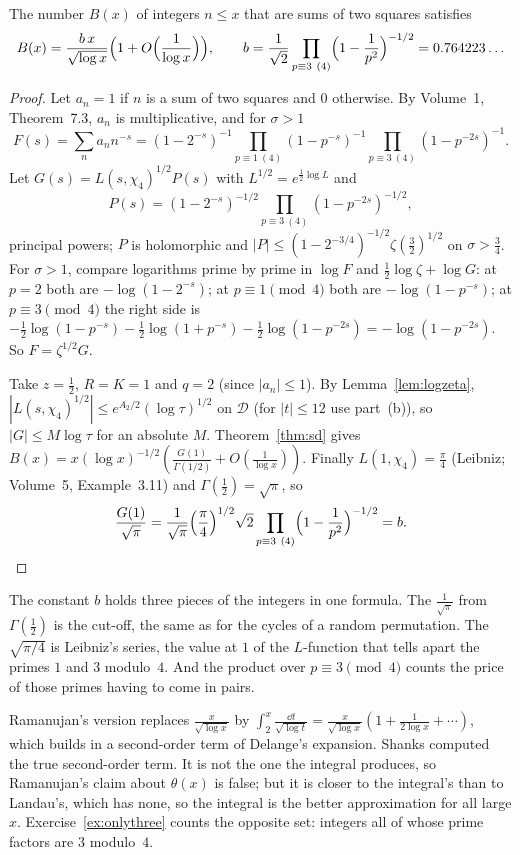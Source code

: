 \begin{corollary}[Landau, 1908]\label{cor:landau}
The number $B(x)$ of integers $n\le x$ that are sums of two squares satisfies
\[
B(x)=\frac{b\,x}{\sqrt{\log x}}\Bigl(1+O\Bigl(\frac1{\log x}\Bigr)\Bigr),\qquad b=\frac1{\sqrt2}\prod_{p\equiv3\ (4)}\Bigl(1-\frac1{p^2}\Bigr)^{-1/2}=0.764223\ldots
\]
\end{corollary}
\begin{proof}
Let $a_n=1$ if $n$ is a sum of two squares and $0$ otherwise. By Volume~1, Theorem~7.3, $a_n$ is multiplicative, and for $\sigma>1$
\[
F(s)=\sum_na_nn^{-s}=(1-2^{-s})^{-1}\prod_{p\equiv1\ (4)}(1-p^{-s})^{-1}\prod_{p\equiv3\ (4)}(1-p^{-2s})^{-1}.
\]
Let $G(s)=L(s,\chi_4)^{1/2}P(s)$ with $L^{1/2}=e^{\frac12\log L}$ and
\[
P(s)=(1-2^{-s})^{-1/2}\prod_{p\equiv3\ (4)}(1-p^{-2s})^{-1/2},
\]
principal powers; $P$ is holomorphic and $|P|\le(1-2^{-3/4})^{-1/2}\zeta(\frac32)^{1/2}$ on $\sigma>\frac34$. For $\sigma>1$, compare logarithms prime by prime in $\log F$ and $\frac12\log\zeta+\log G$: at $p=2$ both are $-\log(1-2^{-s})$; at $p\equiv1\pmod4$ both are $-\log(1-p^{-s})$; at $p\equiv3\pmod4$ the right side is $-\frac12\log(1-p^{-s})-\frac12\log(1+p^{-s})-\frac12\log(1-p^{-2s})=-\log(1-p^{-2s})$. So $F=\zeta^{1/2}G$.

Take $z=\frac12$, $R=K=1$ and $q=2$ (since $|a_n|\le1$). By Lemma~\ref{lem:logzeta}, $|L(s,\chi_4)^{1/2}|\le e^{A_2/2}(\log\tau)^{1/2}$ on $\mathcal D$ (for $|t|\le12$ use part~(b)), so $|G|\le M\log\tau$ for an absolute $M$. Theorem~\ref{thm:sd} gives $B(x)=x(\log x)^{-1/2}(\frac{G(1)}{\Gamma(1/2)}+O(\frac1{\log x}))$. Finally $L(1,\chi_4)=\frac\pi4$ (Leibniz; Volume~5, Example~3.11) and $\Gamma(\frac12)=\sqrt\pi$, so
\[
\frac{G(1)}{\sqrt\pi}=\frac1{\sqrt\pi}\Bigl(\frac\pi4\Bigr)^{1/2}\sqrt2\prod_{p\equiv3\ (4)}\Bigl(1-\frac1{p^2}\Bigr)^{-1/2}=b.\qedhere
\]
\end{proof}

\begin{beauty}
The constant $b$ holds three pieces of the integers in one formula. The $\frac1{\sqrt\pi}$ from $\Gamma(\frac12)$ is the cut-off, the same as for the cycles of a random permutation. The $\sqrt{\pi/4}$ is Leibniz's series, the value at $1$ of the $L$-function that tells apart the primes $1$ and $3$ modulo~$4$. And the product over $p\equiv3\pmod4$ counts the price of those primes having to come in pairs.
\end{beauty}

Ramanujan's version replaces $\frac x{\sqrt{\log x}}$ by $\int_2^x\frac{\dd t}{\sqrt{\log t}}=\frac x{\sqrt{\log x}}(1+\frac1{2\log x}+\cdots)$, which builds in a second-order term of Delange's expansion. Shanks computed the true second-order term. It is not the one the integral produces, so Ramanujan's claim about $\theta(x)$ is false; but it is closer to the integral's than to Landau's, which has none, so the integral is the better approximation for all large $x$. Exercise~\ref{ex:onlythree} counts the opposite set: integers all of whose prime factors are $3$ modulo~$4$.

